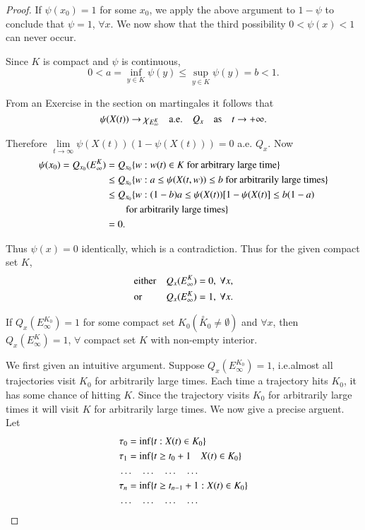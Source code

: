 \begin{proof}
If $\psi(x_{0})=1$ for some $x_{0}$, we apply the above argument to
$1-\psi$ to conclude that $\psi=1$, $\forall x$. We now show that the
third possibility $0<\psi(x)<1$ can never occur.

Since $K$ is compact and $\psi$ is continuous,
$$
0<a=\inf\limits_{y\in K}\psi(y)\leq \sup\limits_{y\in K}\psi(y)=b<1.
$$

From an Exercise in the section on martingales it follows that
$$
\psi(X(t))\to \chi_{E^{K}_{\infty}}\quad\text{a.e.}\quad Q_{x}\quad\text{as}\quad
t\to +\infty.
$$

Therefore $\lim\limits_{t\to \infty}\psi(X(t))(1-\psi(X(t)))=0$ a.e.\@
$Q_{x}$. Now
{\fontsize{10pt}{12pt}\selectfont
\begin{align*}
\psi(x_{0})=Q_{x_{0}}(E^{K}_{\infty}) &= Q_{x_{0}}\{w:w(t)\in K\text{~
  for arbitrary large time}\}\\
&\leq Q_{x_{0}}\{w:a\leq \psi(X(t,w))\leq b\text{~ for arbitrarily
  large times}\}\\
&\leq Q_{x_{0}}\{w:(1-b)a\leq \psi(X(t))[1-\psi(X(t)]\leq b(1-a)\\
&\qquad \text{for arbitrarily large times}\}\\
&= 0.
\end{align*}}\relax\pageoriginale

Thus $\psi(x)=0$ identically, which is a contradiction. Thus for the
given compact set $K$,
\begin{align*}
&\text{either}\quad Q_{x}(E^{K}_{\infty}) =0,\ \forall x,\\
&\text{or}\qquad\;\, Q_{x}(E^{K}_{\infty})=1,\ \forall x.
\end{align*}

\begin{step}%
If $Q_{x}(E^{K_{0}}_{\infty})=1$ for some compact set
$K_{0}(\overset{\circ}{K}_{0}\neq \emptyset)$ and $\forall x$, then
$Q_{x}(E^{K}_{\infty})=1$, $\forall$ compact set $K$ with non-empty
interior.
\end{step}

We first given an intuitive argument. Suppose
$Q_{x}(E^{K_{0}}_{\infty})=1$, i.e.\@ almost all trajectories visit
$K_{0}$ for arbitrarily large times. Each time a trajectory hits
$K_{0}$, it has some chance of hitting $K$. Since the trajectory
visits $K_{0}$ for arbitrarily large times it will visit $K$ for
arbitrarily large times. We now give a precise arguent. Let
\begin{align*}
& \tau_{0}=\inf \{t:X(t)\in K_{0}\}\\
& \tau_{1}=\inf \{t\geq t_{0}+1\quad X(t)\in K_{0}\}\\
& \ldots\quad \ldots\quad \ldots\quad \ldots\\
& \tau_{n}=\inf\{t\geq t_{n-1}+1:X(t)\in K_{0}\}\\
& \ldots\quad \ldots\quad \ldots\quad \ldots\\
\end{align*}


\end{proof}

